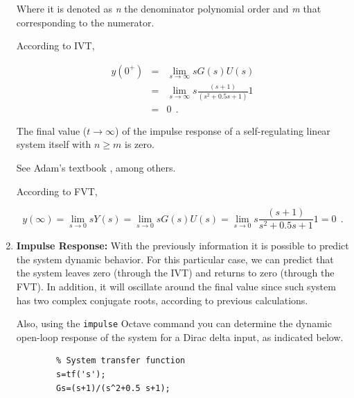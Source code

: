 \begin{enumerate}
	    Where it is denoted as \textit{n} the denominator polynomial order and \textit{m} that corresponding to the numerator.
		
		\vspace{0.4cm}
		According to IVT,
		
		\begin{eqnarray*}
			y(0^{+}) &=& \lim _{s \to \infty } sG(s)U(s)\\
			&=& \lim _{s \to \infty } s \frac{(s+1)}{\left ( s^2 + 0.5 s + 1 \right ) } 1\\
			&=& 0  ~~\mbox{.}
		\end{eqnarray*}
		
		\vspace{0.4cm}
		
		\begin{remark}
			\begin{remarca}\label{rem02_chp_trans}
				The final value ($t \to \infty$) of the impulse response of a self-regulating linear system itself with $n \ge m$ is zero.
			\end{remarca}
			
			\begin{demo}
				See Adam's textbook \cite{Adam2018}, among others.
			\end{demo}
		\end{remark}
		
		According to FVT,
		
		\begin{equation*} 
			y(\infty)= \lim _{s \to 0} s Y(s) = \lim _{s \to 0} s G(s)U(s) = \lim _{s \to 0} s \frac{(s+1)}{s^2+0.5 s+1}1=0
			~~\mbox{.}
		\end{equation*}
		
		
		\item \textbf{Impulse Response:} With the previously information it is possible to predict the system dynamic behavior. For this particular case, we can predict that the system leaves zero (through the IVT) and returns to zero (through the FVT). In addition, it will oscillate around the final value since such system has two complex conjugate roots, according to previous calculations.
		
		
		Also, using the \texttt{impulse}  Octave command you can determine the dynamic open-loop response of the system for a Dirac delta input, as indicated below.
		
		\begin{verbatim}
		% System transfer function
		s=tf('s');
		Gs=(s+1)/(s^2+0.5 s+1);
		

\end{verbatim}
\end{enumerate}
